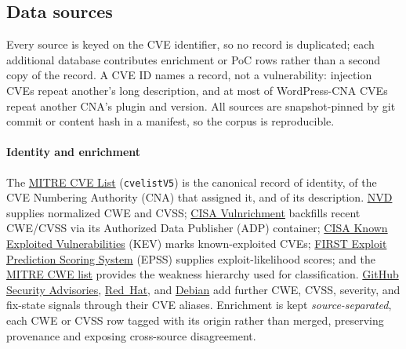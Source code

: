 \subsection{Data sources}
\label{sec:data}

Every source is keyed on the CVE identifier, so no record is duplicated;
each additional database contributes enrichment or PoC rows rather than a second
copy of the record.
A CVE ID names a record, not a vulnerability: \dataLongDescriptionTwins injection CVEs
repeat another's long description, and at most \dataWordpressCnaRepeats of
\dataWordpressCnaCves WordPress-CNA CVEs repeat another CNA's plugin and version.
All sources are snapshot-pinned by git commit or content hash in a manifest, so
the corpus is reproducible.

\paragraph{Identity and enrichment}
The \href{https://github.com/CVEProject/cvelistV5}{MITRE CVE List}
(\texttt{cvelistV5}) is the canonical record of identity, of the CVE Numbering
Authority (CNA) that assigned it, and of its description.
\href{https://nvd.nist.gov/vuln/data-feeds}{NVD} supplies normalized CWE and CVSS; \href{https://github.com/cisagov/vulnrichment}{CISA Vulnrichment}
backfills recent CWE/CVSS via its Authorized Data Publisher (ADP) container;
\href{https://github.com/cisagov/kev-data}{CISA Known Exploited Vulnerabilities} (KEV) marks known-exploited CVEs;
\href{https://www.first.org/epss/}{FIRST Exploit Prediction Scoring System} (EPSS) supplies exploit-likelihood
scores; and the \href{https://cwe.mitre.org/}{MITRE CWE list} provides the
weakness hierarchy used for classification.
\href{https://github.com/github/advisory-database}{GitHub Security Advisories},
\href{https://access.redhat.com/security/data}{Red~Hat}, and
\href{https://security-tracker.debian.org/tracker/}{Debian} add further CWE,
CVSS, severity, and fix-state signals through their CVE aliases.
Enrichment is kept \emph{source-separated}, each CWE or CVSS row tagged with its
origin rather than merged, preserving provenance and exposing cross-source
disagreement.

